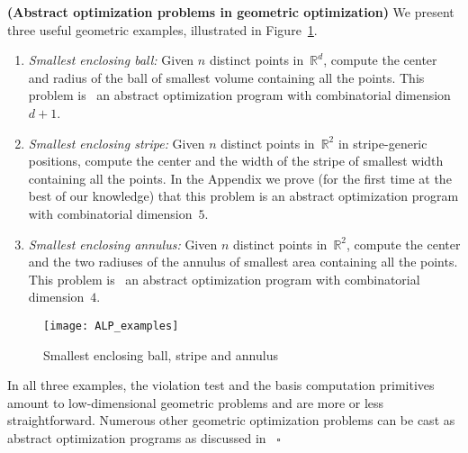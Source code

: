 \documentclass[onecolumn,journal,letterpaper]{IEEEtran}
\newcommand{\real}{{\mathbb{R}}}
\newcommand\oprocendsymbol{\hbox{$\square$}}
\newcommand\oprocend{\relax\ifmmode\else\unskip\hfill\fi\oprocendsymbol}
\begin{document}
\begin{example}\textbf{\textup{(Abstract optimization problems in
    geometric optimization)}}
  \label{rem:examples}
  We present three useful geometric examples, illustrated in
  Figure~\ref{fig:geometric-alp}.
  \begin{enumerate}
  \item \emph{Smallest enclosing ball:} Given $n$ distinct points
    in~$\real^d$, compute the center and radius of the ball of smallest
    volume containing all the points.  This problem is~\cite{JM-MS-EW:96}
    an abstract optimization program with combinatorial dimension~$d+1$.


  \item \emph{Smallest enclosing stripe:}
Given $n$ distinct points in~$\real^2$ in stripe-generic positions,
    compute the center and the width of the stripe of smallest width
    containing all the points. In the Appendix we prove (for the first time
    at the best of our knowledge) that this problem is an abstract
    optimization program with combinatorial dimension~$5$.

  \item \emph{Smallest enclosing annulus:} Given $n$ distinct points
    in~$\real^2$, compute the center and the two radiuses of the annulus of
    smallest area containing all the points.  This problem
    is~\cite{JM-MS-EW:96} an abstract optimization program with
    combinatorial dimension~$4$.
  \end{enumerate}
  \begin{figure}[htbp]
    \centering
\texttt{[image: ALP\_examples]}\caption{Smallest enclosing ball, stripe and annulus}
    \label{fig:geometric-alp}
  \end{figure}
  In all three examples, the violation test and the basis computation
  primitives amount to low-dimensional geometric problems and are more or
  less straightforward. Numerous other geometric optimization problems can
  be cast as abstract optimization programs as discussed
  in~\cite{JM-MS-EW:96,BG:95,BG-EW:96,PKA-SS:01} \oprocend
\end{example}
\end{document}
